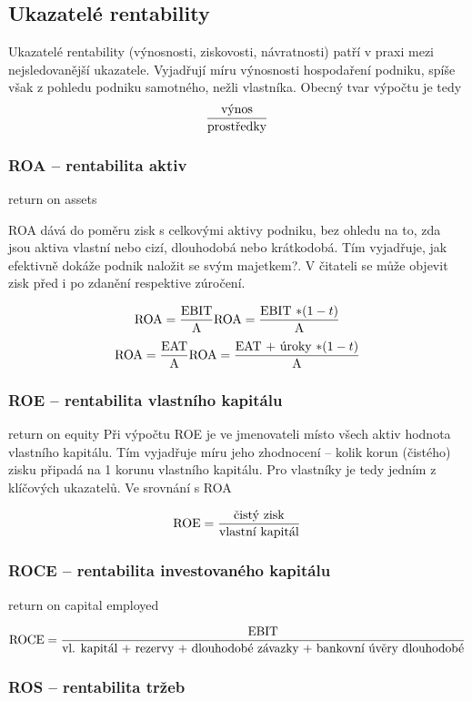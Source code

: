 \subsection{Ukazatelé rentability}

Ukazatelé rentability (výnosnosti, ziskovosti, návratnosti) patří v praxi mezi nejsledovanější ukazatele. Vyjadřují míru výnosnosti hospodaření podniku, spíše však z pohledu podniku samotného, nežli vlastníka. Obecný tvar výpočtu je tedy 
$$\dfrac{\text{výnos}}{\text{prostředky}}$$

\subsubsection{ROA -- rentabilita aktiv}

return on assets

ROA dává do poměru zisk s celkovými aktivy podniku, bez ohledu na to, zda jsou aktiva vlastní nebo cizí, dlouhodobá nebo krátkodobá. Tím vyjadřuje, jak efektivně dokáže podnik naložit se svým majetkem?. V čitateli se může objevit zisk před i po zdanění respektive zúročení.

$$\text{ROA} = \dfrac{\text{EBIT}}{\text{A}}  \text{ROA} = \dfrac{\text{EBIT $*(1-t)$}}{\text{A}}$$ 
$$\text{ROA} = \dfrac{\text{EAT}}{\text{A}}  \text{ROA} = \dfrac{\text{EAT $+$ úroky $*(1-t)$}}{\text{A}}$$

\subsubsection{ROE -- rentabilita vlastního kapitálu}

return on equity
Při výpočtu ROE je ve jmenovateli místo všech aktiv hodnota vlastního kapitálu. Tím vyjadřuje míru jeho zhodnocení -- kolik korun (čistého) zisku připadá na 1 korunu vlastního kapitálu. Pro vlastníky je tedy jedním z klíčových ukazatelů. Ve srovnání s ROA

$$\text{ROE} = \dfrac{\text{čistý zisk}}{\text{vlastní kapitál}}$$ 

\subsubsection{ROCE -- rentabilita investovaného kapitálu}

return on capital employed

$$\text{ROCE} = \dfrac{\text{EBIT}}{\text{vl. kapitál + rezervy + dlouhodobé závazky + bankovní úvěry dlouhodobé}}$$ 

\subsubsection{ROS -- rentabilita tržeb}


